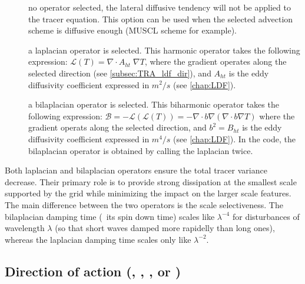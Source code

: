 \documentclass[../main/NEMO_manual]{subfiles}
\begin{document}
\begin{description}
\item [{}] no operator selected,
  the lateral diffusive tendency will not be applied to the tracer equation.
  This option can be used when the selected advection scheme is diffusive enough
  (MUSCL scheme for example).
\item [{}] a laplacian operator is selected.
  This harmonic operator takes the following expression:
  $\mathcal{L}(T) = \nabla \cdot A_{ht} \; \nabla T $,
  where the gradient operates along the selected direction (see \autoref{subsec:TRA_ldf_dir}),
  and $A_{ht}$ is the eddy diffusivity coefficient expressed in $m^2/s$ (see \autoref{chap:LDF}).
\item [{}] a bilaplacian operator is selected.
  This biharmonic operator takes the following expression:
  $\mathcal{B} = - \mathcal{L}(\mathcal{L}(T)) = - \nabla \cdot b \nabla (\nabla \cdot b \nabla T)$
  where the gradient operats along the selected direction,
  and $b^2 = B_{ht}$ is the eddy diffusivity coefficient expressed in $m^4/s$
  (see \autoref{chap:LDF}).
  In the code, the bilaplacian operator is obtained by calling the laplacian twice.
\end{description}

Both laplacian and bilaplacian operators ensure the total tracer variance decrease.
Their primary role is to provide strong dissipation at the smallest scale supported by the grid while
minimizing the impact on the larger scale features.
The main difference between the two operators is the scale selectiveness.
The bilaplacian damping time (\ie\ its spin down time) scales like
$\lambda^{-4}$ for disturbances of wavelength $\lambda$
(so that short waves damped more rapidelly than long ones),
whereas the laplacian damping time scales only like $\lambda^{-2}$.

\subsection[Action direction (\forcode{ln_traldf_}\{\forcode{lev,hor,iso,triad}\})]{Direction of action (\protect{}, \protect{}, \protect{}, or \protect{})}
\label{subsec:TRA_ldf_dir}
\end{document}
